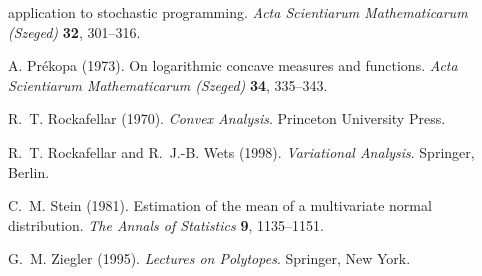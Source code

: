 \begin{description}
application to stochastic programming. \emph{Acta Scientiarum Mathematicarum
(Szeged)} \textbf{32}, 301--316.
\item[{[Pre73]}] A. Pr\'ekopa (1973). On logarithmic concave measures and
functions. \emph{Acta Scientiarum Mathematicarum (Szeged)} \textbf{34},
335--343.
\item[{[Roc70]}] R.~T. Rockafellar (1970). \emph{Convex Analysis}. Princeton
University Press.
\item[{[RW98]}] R.~T. Rockafellar and R.~J.-B. Wets (1998). \emph{Variational
Analysis}. Springer, Berlin.
\item[{[Ste81]}] C.~M. Stein (1981). Estimation of the mean of a multivariate
normal distribution. \emph{The Annals of Statistics} \textbf{9}, 1135--1151.
\item[{[Zie95]}] G.~M. Ziegler (1995). \emph{Lectures on Polytopes}.
Springer, New York.
\end{description}



